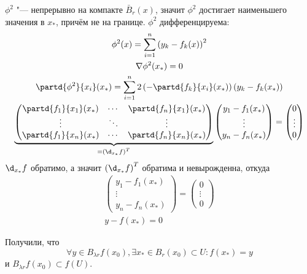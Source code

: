 		$\phi^2$ "--- непрерывно на компакте $\bar B_r(x)$, значит $\phi^2$ достигает наименьшего значения в $x_*$, причём не на границе.
		$\phi^2$ дифференцируема:
		\begin{gather*}
			\phi^2(x) = \sum_{i=1}^n \left(y_k - f_k(x)\right)^2 \\
			\nabla \phi^2(x_*) = 0 \\
			\partd{\phi^2}{x_i}(x_*) = \sum_{i=1}^n 2\left(-\partd{f_k}{x_i} (x_*)\right)\left(y_k - f_k(x_*)\right) \\
			\underbrace{\begin{pmatrix}
					\partd{f_1}{x_1}(x_*) & \cdots & \partd{f_n}{x_1}(x_*) \\
					\vdots & \ddots & \vdots \\
					\partd{f_1}{x_n}(x_*) & \cdots & \partd{f_n}{x_n}(x_*)
				\end{pmatrix}
				}_{=\left(\d_{x_*} f\right)^T}
				\begin{pmatrix}
					y_1 - f_1(x_*) \\
					\vdots \\
					y_n - f_n(x_*)
				\end{pmatrix}
				=
				\begin{pmatrix}
					0 \\
					\vdots \\
					0
				\end{pmatrix}
		\end{gather*}
		$\d_{x_*} f$ обратимо, а значит $\left(\d_{x_*} f\right)^T$ обратима и невырожденна, откуда
		\begin{gather*}
			\begin{pmatrix}
					y_1 - f_1(x_*) \\
					\vdots \\
					y_n - f_n(x_*)
				\end{pmatrix}
				=
				\begin{pmatrix}
					0 \\
					\vdots \\
					0
				\end{pmatrix} \\
			y - f(x_*) = 0
		\end{gather*}

		Получили, что
		\[ \forall y \in B_{\lambda r} f(x_0), \exists x_* \in B_r(x_0) \subset U\colon f(x_*) = y \]
		и $B_{\lambda r} f(x_0) \subset f(U)$.

